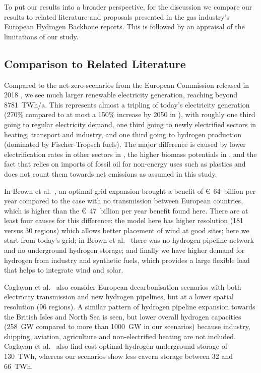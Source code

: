 To put our results into a broader perspective, for the discussion we compare our
results to related literature and proposals presented in the gas industry's
European Hydrogen Backbone reports. This is followed by an appraisal of the
limitations of our study.

\subsection*{Comparison to Related Literature}


Compared to the net-zero scenarios from the European Commission released in 2018
\cite{in-depth_2018}, we see much larger renewable electricity generation,
reaching beyond 8781~TWh/a. This represents almost a tripling of today's
electricity generation (270\% compared to at most a 150\% increase by 2050 in
\cite{in-depth_2018}), with roughly one third going to regular electricity
demand, one third going to newly electrified sectors in heating, transport and
industry, and one third going to hydrogen production (dominated by
Fischer-Tropsch fuels). The major difference is caused by lower electrification
rates in other sectors in \cite{in-depth_2018}, the higher biomass potentials in
\cite{in-depth_2018}, and the fact that \cite{in-depth_2018} relies on imports
of fossil oil for non-energy uses such as plastics and does not count them
towards net emissions as assumed in this study.



In Brown et al.~\cite{brownSynergiesSector2018}, an optimal grid expansion
brought a benefit of \euro~64~billion per year compared to the case with no
transmission between European countries, which is higher than the
\euro~47~billion per year benefit found here. There are at least four causes for
this difference: the model here has higher resolution (181 versus 30 regions)
which allows better placement of wind at good sites; here we start from today's
grid; in Brown et al.~\cite{brownSynergiesSector2018} there was no hydrogen
pipeline network and no underground hydrogen storage; and finally we have higher
demand for hydrogen from industry and synthetic fuels, which provides a large
flexible load that helps to integrate wind and solar.


Caglayan et al.~\cite{Caglayan2019} also consider European decarbonisation
scenarios with both electricity transmission and new hydrogen pipelines, but at
a lower spatial resolution (96 regions). A similar pattern of hydrogen pipeline
expansion towards the British Isles and North Sea is seen, but lower overall
hydrogen capacities (258~GW compared to more than 1000~GW in our scenarios)
because industry, shipping, aviation, agriculture and non-electrified heating
are not included. Caglayan et al.~\cite{Caglayan2019} also find cost-optimal
hydrogen underground storage of 130~TWh, whereas our scenarios show less cavern
storage between 32 and 66~TWh.

